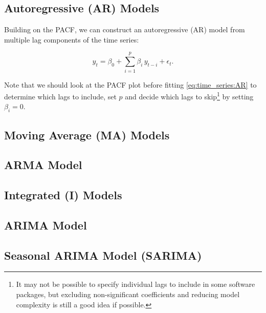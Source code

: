 \subsection{Autoregressive (AR) Models}
\label{additional:time_series:AR}
Building on the PACF, we can construct an autoregressive (AR) model
from multiple lag components of the time series:

\begin{equation}\label{eq:time_series:AR}
\hat{y}_{t} = \beta_{0} + \sum_{i=1}^{p} \beta_{i}\, y_{t-i} + \epsilon_{t}.
\end{equation}

Note that we should look at the PACF plot before fitting \cref{eq:time_series:AR}
to determine which lags to include,
\ie set $p$ and decide which lags to skip\footnote{It may not be possible
to specify individual lags to include in some software packages,
but excluding non-significant coefficients and reducing model complexity
is still a good idea if possible.} by setting $\beta_{i} = 0$.

\subsection{Moving Average (MA) Models}
\label{additional:time_series:MA}

\subsection{ARMA Model}
\label{additional:time_series:ARMA}
\subsection{Integrated (I) Models}
\label{additional:time_series:I}

\subsection{ARIMA Model}
\label{additional:time_series:ARIMA}

\subsection{Seasonal ARIMA Model (SARIMA)}
\label{additional:time_series:SARIMA}

